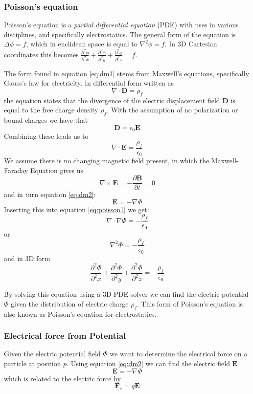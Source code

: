\subsubsection{Poisson's equation}
Poisson's equation is a \emph{partial differential equation} (PDE) with uses in various disciplines, and specifically electrostatics.
The general form of the equation is $\Delta\phi = f$, which in euclidean space is equal to $\nabla^2\phi = f$. In 3D
Cartesian coordinates this becomes $\frac{\partial ^2\phi}{\partial ^2 x} + \frac{\partial^2\phi}{\partial ^2 y} + \frac{\partial ^2\phi}{\partial ^2 z}= f$.

The form found in equation \ref{eq:dm1} stems from Maxwell's equations, specifically Gauss's law for electricity. In
differential form written as
$$\nabla \cdot \mathbf{D} = \rho_f$$
the equation states that the divergence of the electric displacement field $\mathbf{D}$ is equal to the free charge
density $\rho_f$. With the assumption of no polarization or bound charges we have that
$$\mathbf{D} = \epsilon_0\mathbf{E}$$
Combining these leads us to
\begin{equation} \label{eq:poisson1} \nabla \cdot \mathbf{E} = \frac{\rho_f}{\epsilon_0} \end{equation}
We assume there is no changing magnetic field present, in which the Maxwell-Faraday Equation gives us
$$\nabla \times \mathbf{E} = -\frac{\partial\mathbf{B}}{\partial t}=0$$
and in turn equation \ref{eq:dm2}:
$$\mathbf{E}=-\nabla\Phi$$
Inserting this into equation \ref{eq:poisson1} we get:
$$\nabla \cdot \nabla \Phi = -\frac{\rho_f}{\epsilon_0}$$
or
$$ \nabla^2\Phi = -\frac{\rho_f}{\epsilon _0}$$
and in 3D form
$$\frac{\partial ^2\Phi}{\partial ^2 x} + \frac{\partial^2\Phi}{\partial ^2 y} + \frac{\partial ^2\Phi}{\partial ^2 z}= -\frac{\rho_f}{\epsilon _0}$$

By solving this equation using a 3D PDE solver we can find the electric potential $\Phi$ given the distribution of
electric charge $\rho_f$. This form of Poisson's equation is also known as Poisson's equation for electrostatics.

\subsubsection{Electrical force from Potential}
Given the electric potential field $\Phi$ we want to determine the electrical force on a particle at position $p$. Using
equation \ref{eq:dm2} we can find the electric field $\mathbf{E}$
$$ \mathbf{E} = -\nabla\Phi $$
which is related to the electric force by
$$ \mathbf{F}_e = q\mathbf{E}$$

